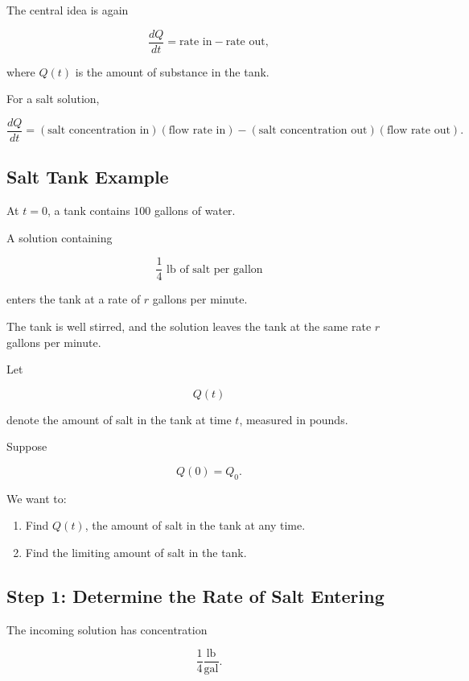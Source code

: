 \documentclass[11pt]{article}
\begin{document}
The central idea is again

\[
\boxed{
\frac{dQ}{dt}
=
\text{rate in}
-
\text{rate out},
}
\]

where \(Q(t)\) is the amount of substance in the tank.

For a salt solution,

\[
\boxed{
\frac{dQ}{dt}
=
(\text{salt concentration in})
(\text{flow rate in})
-
(\text{salt concentration out})
(\text{flow rate out}).
}
\]

\subsection{Salt Tank Example}

At \(t=0\), a tank contains \(100\) gallons of water.

A solution containing

\[
\frac14\text{ lb of salt per gallon}
\]

enters the tank at a rate of \(r\) gallons per minute.

The tank is well stirred, and the solution leaves the tank at the
same rate \(r\) gallons per minute.

Let

\[
Q(t)
\]

denote the amount of salt in the tank at time \(t\), measured in
pounds.

Suppose

\[
Q(0)=Q_0.
\]

We want to:

\begin{enumerate}
    \item Find \(Q(t)\), the amount of salt in the tank at any time.
    \item Find the limiting amount of salt in the tank.
\end{enumerate}

\subsection{Step 1: Determine the Rate of Salt Entering}

The incoming solution has concentration

\[
\frac14\frac{\text{lb}}{\text{gal}}.
\]
\end{document}
